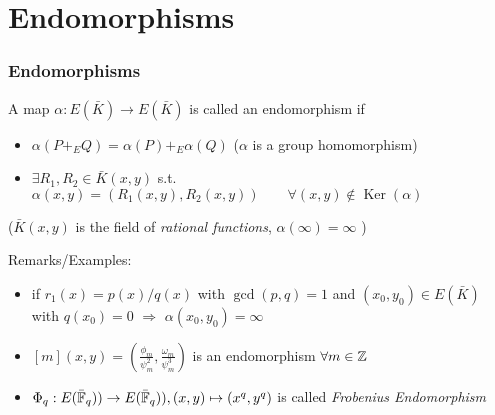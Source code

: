 \documentclass[10pt,handout]{beamer} %
\begin{document}
\section{Endomorphisms}

\begin{frame}
\frametitle{Endomorphisms}

\begin{definition} A map \alert{$\alpha: E(\bar{K})\rightarrow E(\bar{K})$} is called
an \alert{endomorphism} if\pause
\begin{itemize}[<+-| alert@+>]
  \item $\alpha(P+_EQ)=\alpha(P)+_E\alpha(Q)$ ($\alpha$ is a group homomorphism)
  \item $\exists R_1,R_2\in \bar{K}(x,y)$ s.t. $\alpha(x,y)=(R_1(x,y),R_2(x,y))\qquad\forall (x,y)\not\in\operatorname{Ker}(\alpha) $
\end{itemize}\pause
($\bar{K}(x,y)$ is the field of \emph{rational functions}, \pause  $\alpha(\infty)=\infty$
)\vspace*{-1pt}
\end{definition}\vspace*{-3.5pt}\pause

\vspace*{-1pt}\pause

\begin{beamerboxesrounded}[upper=block title example,lower=block body alerted,shadow=true]{Remarks/Examples:}
\begin{itemize}[<+-| alert@+>]
\item if $r_1(x)=p(x)/q(x)$ with $\gcd(p,q)=1$ and $(x_0,y_0)\in E(\bar{K})$ with $q(x_0)=0$ $\Rightarrow$ $\alpha(x_0,y_0)=\infty$
\item $[m](x,y)=\left(\frac{\phi_m}{\psi_m^2},\frac{\omega_m}{\psi_m^3}\right)$ is an
endomorphism $\forall m\in\mathbb Z$
\item $\Phi_q:E(\bar{\mathbb F}_q))\rightarrow E(\bar{\mathbb F}_q)), (x,y)\mapsto(x^q,y^q)$ is called
\emph{Frobenius Endomorphism}
\end{itemize}
\end{beamerboxesrounded}
\end{frame}
\end{document}
